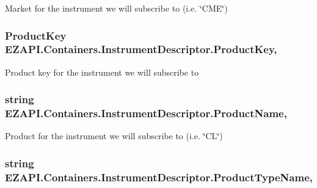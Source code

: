 Market for the instrument we will subscribe to (i.\-e. \char`\"{}\-C\-M\-E\char`\"{}) 

\hypertarget{class_e_z_a_p_i_1_1_containers_1_1_instrument_descriptor_ae4bd32949b19a10f0ceefb9ffa41f640}{
\subsubsection[{Product\-Key}]{\setlength{\rightskip}{0pt plus 5cm}Product\-Key E\-Z\-A\-P\-I.\-Containers.\-Instrument\-Descriptor.\-Product\-Key\hspace{0.3cm}{\ttfamily [get]}, {\ttfamily [set]}}}\label{class_e_z_a_p_i_1_1_containers_1_1_instrument_descriptor_ae4bd32949b19a10f0ceefb9ffa41f640}


Product key for the instrument we will subscribe to 

\hypertarget{class_e_z_a_p_i_1_1_containers_1_1_instrument_descriptor_ab5504fdb91ebedf1fb17141d350aef5e}{
\subsubsection[{Product\-Name}]{\setlength{\rightskip}{0pt plus 5cm}string E\-Z\-A\-P\-I.\-Containers.\-Instrument\-Descriptor.\-Product\-Name\hspace{0.3cm}{\ttfamily [get]}, {\ttfamily [set]}}}\label{class_e_z_a_p_i_1_1_containers_1_1_instrument_descriptor_ab5504fdb91ebedf1fb17141d350aef5e}


Product for the instrument we will subscribe to (i.\-e. \char`\"{}\-C\-L\char`\"{}) 

\hypertarget{class_e_z_a_p_i_1_1_containers_1_1_instrument_descriptor_a87f1888c91572713fe1860da8e2ffca5}{
\subsubsection[{Product\-Type\-Name}]{\setlength{\rightskip}{0pt plus 5cm}string E\-Z\-A\-P\-I.\-Containers.\-Instrument\-Descriptor.\-Product\-Type\-Name\hspace{0.3cm}{\ttfamily [get]}, {\ttfamily [set]}}}\label{class_e_z_a_p_i_1_1_containers_1_1_instrument_descriptor_a87f1888c91572713fe1860da8e2ffca5}


